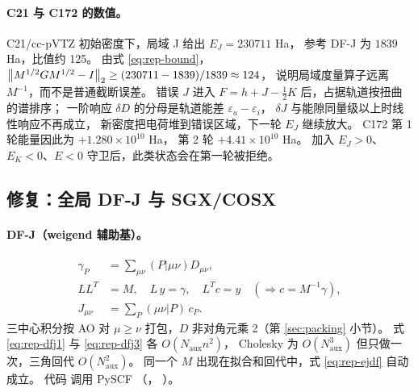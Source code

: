\paragraph{C21 与 C172 的数值。}
C21/cc-pVTZ 初始密度下，局域 J 给出 \(E_J=230711\) Ha，
参考 DF-J 为 \(1839\) Ha，比值约 125。
由式 \eqref{eq:rep-bound}，
\(\left\lVert M^{1/2}GM^{1/2}-I\right\rVert_2\geq(230711-1839)/1839\approx124\)，
说明局域度量算子远离 \(M^{-1}\)，而不是普通截断误差。
错误 \(J\) 进入 \(F=h+J-\frac12K\) 后，占据轨道按扭曲的谱排序；
一阶响应 \(\delta D\) 的分母是轨道能差 \(\varepsilon_a-\varepsilon_i\)，
\(\delta J\) 与能隙同量级以上时线性响应不再成立，
新密度把电荷堆到错误区域，下一轮 \(E_J\) 继续放大。
C172 第 1 轮能量因此为 \(+1.280\times10^{10}\) Ha，
第 2 轮 \(+4.41\times10^{10}\) Ha。
加入 \(E_J>0\)、\(E_K<0\)、\(E<0\) 守卫后，此类状态会在第一轮被拒绝。

\subsection{修复：全局 DF-J 与 SGX/COSX}
\label{sec:repair-fix}
\paragraph{DF-J（weigend 辅助基）。}
\begin{align}
\gamma_P&=\sum_{\mu\nu}(P|\mu\nu)D_{\mu\nu}, \label{eq:rep-dfj1}\\
LL^T&=M,\quad L\,y=\gamma,\quad L^Tc=y
\quad(\Rightarrow c=M^{-1}\gamma), \label{eq:rep-dfj2}\\
J_{\mu\nu}&=\sum_P(\mu\nu|P)\,c_P . \label{eq:rep-dfj3}
\end{align}
三中心积分按 AO 对 \(\mu\geq\nu\) 打包，\(D\) 非对角元乘 2（第 \ref{sec:packing} 小节）。
式 \eqref{eq:rep-dfj1} 与 \eqref{eq:rep-dfj3} 各 \(O(N_{\mathrm{aux}}n^2)\)，
Cholesky 为 \(O(N_{\mathrm{aux}}^3)\) 但只做一次，三角回代 \(O(N_{\mathrm{aux}}^2)\)。
同一个 \(M\) 出现在拟合和回代中，式 \eqref{eq:rep-ejdf} 自动成立。
代码  调用 PySCF （，
）。

